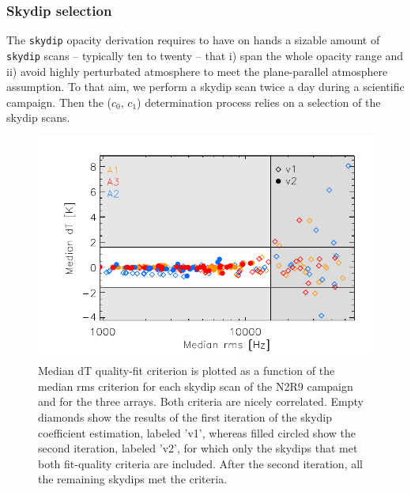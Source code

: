 \subsubsection{Skydip selection}
\label{se:skydip-selection}

The {\tt skydip} opacity derivation requires to have on hands a
sizable amount of {\tt skydip} scans --
typically ten to twenty -- that i) span the whole opacity range and
ii) avoid highly perturbated atmosphere to meet the plane-parallel
atmosphere assumption. To that aim, we perform a skydip
scan twice a day during a scientific campaign. Then the ($c_0$, $c_1$)
determination process relies on a selection of the skydip scans.
%
\begin{figure}[!thbp]
\begin{center}
\includegraphics[clip=true,width=\linewidth]{Figures/plot_skydip_selection_two_crit.pdf}
\caption[N2R9 skydip scan selection.]{ Median dT quality-fit criterion
is plotted as a function of the median rms criterion for each skydip
scan of the N2R9 campaign and for the three arrays. Both criteria are
nicely correlated. Empty diamonds show the results of the first
iteration of the skydip coefficient estimation, labeled 'v1', whereas
filled circled show the second iteration, labeled 'v2', for which only the skydips
that met both fit-quality criteria are included.
After the second iteration, all the remaining skydips met the criteria.}
\label{fig:skydipselection}
\end{center}
\end{figure}

